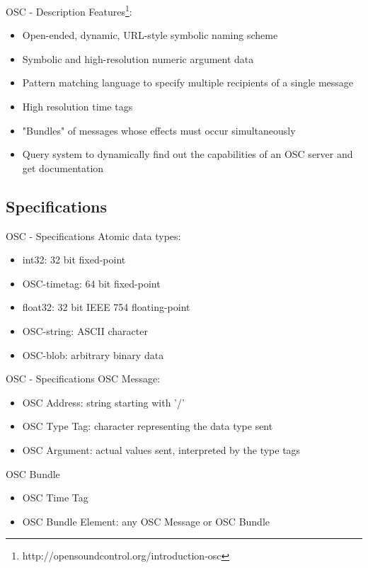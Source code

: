 \documentclass{beamer}
\begin{document}
\begin{frame}{OSC - Description}
    Features\footnote{http://opensoundcontrol.org/introduction-osc}:
    \begin{itemize}
        \item Open-ended, dynamic, URL-style symbolic naming scheme
        \item Symbolic and high-resolution numeric argument data
        \item Pattern matching language to specify multiple recipients of a single message
        \item High resolution time tags
        \item "Bundles" of messages whose effects must occur simultaneously
        \item Query system to dynamically find out the capabilities of an OSC server and get documentation
  \end{itemize}  
\end{frame}

\subsection{Specifications}

\begin{frame}{OSC - Specifications}
    Atomic data types:
    \begin{itemize}
        \item int32: 32 bit fixed-point
        \item OSC-timetag: 64 bit fixed-point
        \item float32: 32 bit IEEE 754 floating-point
        \item OSC-string: ASCII character
        \item OSC-blob: arbitrary binary data
  \end{itemize}  
\end{frame}

\begin{frame}{OSC - Specifications}
    OSC Message:
    \begin{itemize}
        \item OSC Address: string starting with '/'
        \item OSC Type Tag: character representing the data type sent
        \item OSC Argument: actual values sent, interpreted by the type tags
    \end{itemize}  
    \vspace{5mm}
    OSC Bundle
    \begin{itemize}
        \item OSC Time Tag
        \item OSC Bundle Element: any OSC Message or OSC Bundle
    \end{itemize}  
\end{frame}
\end{document}

